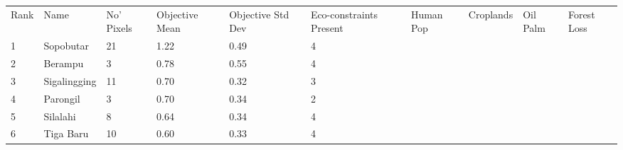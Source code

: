 \begin{table}[ht]
\centering
\begingroup\fontsize{9pt}{10pt}\selectfont
\begin{tabular}{C{0.05\textwidth}C{0.15\textwidth}C{0.08\textwidth}C{0.08\textwidth}C{0.08\textwidth}C{0.08\textwidth}C{0.08\textwidth}C{0.08\textwidth}C{0.08\textwidth}C{0.08\textwidth}}
 Rank & Name & No' Pixels & Objective Mean & Objective Std Dev & Eco-constraints  Present & Human Pop & Croplands & Oil Palm & Forest Loss \\ 
 {1} & Sopobutar &  21 & \textcolor[HTML]{FFFFFF}{1.22} & \textcolor[HTML]{FFFFFF}{0.49} & \textcolor[HTML]{FFFFFF}{4} &  &  &  &  \\ 
  {2} & Berampu &   3 & \textcolor[HTML]{000000}{0.78} & \textcolor[HTML]{FFFFFF}{0.55} & \textcolor[HTML]{FFFFFF}{4} &  &  &  &  \\ 
  {3} & Sigalingging &  11 & \textcolor[HTML]{000000}{0.70} & \textcolor[HTML]{000000}{0.32} & \textcolor[HTML]{000000}{3} &  &  &  &  \\ 
  {4} & Parongil &   3 & \textcolor[HTML]{000000}{0.70} & \textcolor[HTML]{000000}{0.34} & \textcolor[HTML]{000000}{2} &  &  &  &  \\ 
  {5} & Silalahi &   8 & \textcolor[HTML]{000000}{0.64} & \textcolor[HTML]{000000}{0.34} & \textcolor[HTML]{FFFFFF}{4} &  &  &  &  \\ 
  {6} & Tiga Baru &  10 & \textcolor[HTML]{000000}{0.60} & \textcolor[HTML]{000000}{0.33} & \textcolor[HTML]{FFFFFF}{4} &  &  &  &  \\ 

\end{tabular}
\end{table}
